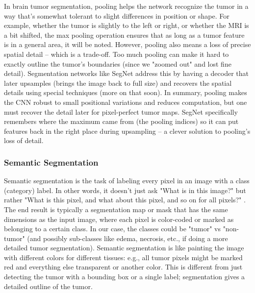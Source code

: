 In brain tumor segmentation, pooling helps the network recognize the tumor in a way that's somewhat tolerant to slight differences in position or shape. For example, whether the tumor is slightly to the left or right, or whether the MRI is a bit shifted, the max pooling operation ensures that as long as a tumor feature is in a general area, it will be noted. However, pooling also means a loss of precise spatial detail – which is a trade-off. Too much pooling can make it hard to exactly outline the tumor's boundaries (since we "zoomed out" and lost fine detail). Segmentation networks like SegNet address this by having a decoder that later upsamples (brings the image back to full size) and recovers the spatial details using special techniques (more on that soon). In summary, pooling makes the CNN robust to small positional variations and reduces computation, but one must recover the detail later for pixel-perfect tumor maps. SegNet specifically remembers where the maximum came from (the pooling indices) so it can put features back in the right place during upsampling – a clever solution to pooling's loss of detail.

\subsubsection{Semantic Segmentation}
\label{sec:semantic_segmentation}

Semantic segmentation is the task of labeling every pixel in an image with a class (category) label. In other words, it doesn't just ask "What is in this image?" but rather "What is this pixel, and what about this pixel, and so on for all pixels?" \cite{ieee2023dnn}. The end result is typically a segmentation map or mask that has the same dimensions as the input image, where each pixel is color-coded or marked as belonging to a certain class. In our case, the classes could be "tumor" vs "non-tumor" (and possibly sub-classes like edema, necrosis, etc., if doing a more detailed tumor segmentation). Semantic segmentation is like painting the image with different colors for different tissues: e.g., all tumor pixels might be marked red and everything else transparent or another color. This is different from just detecting the tumor with a bounding box or a single label; segmentation gives a detailed outline of the tumor.

